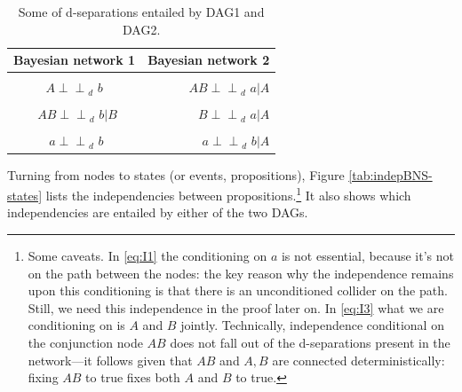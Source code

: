 \documentclass[
  10pt,
  dvipsnames,enabledeprecatedfontcommands]{scrartcl}
\newcommand{\indep}{\!\perp \!\!\! \perp\!}
\begin{document}
\begin{table}[h]
\begin{tabular}{cr}
\toprule
Bayesian network 1  & Bayesian network 2\\
\midrule
\cellcolor{gray!6}{$A   \indep_d\,\, B  $}&\cellcolor{gray!6}{     $ A  \indep_d\,\, b \vert  B  $} \\
$A   \indep_d\,\, b  $& $AB  \indep_d\,\,  a \vert  A$\\
\cellcolor{gray!6}{$\,\,\, AB  \indep_d\,\, a \vert A $}  & \cellcolor{gray!6}{$AB  \indep_d\,\,  b \vert  B $}\\
$\,\,\, AB  \indep_d\,\, b \vert B  $ & $ B  \indep_d\,\,  a \vert  A $\\
\cellcolor{gray!6}{$B   \indep_d\,\, a $}        & \cellcolor{gray!6}{$a  \indep_d\,\,  b \vert  B$ }\\
$\,\, a    \indep_d\,\, b$    & $a  \indep_d\,\,  b \vert  A $ \\
\bottomrule
\end{tabular}
\caption{Some of d-separations entailed by \textsf{DAG1} and \textsf{DAG2}.} 
\label{tab:indepBNS}
\end{table}

Turning from nodes to states (or events, propositions), Figure
\ref{tab:indepBNS-states} lists the independencies between
propositions.\footnote{Some caveats. In \eqref{eq:I1} the conditioning
  on \(a\) is not essential, because it's not on the path between the
  nodes: the key reason why the independence remains upon this
  conditioning is that there is an unconditioned collider on the path.
  Still, we need this independence in the proof later on. In
  \eqref{eq:I3} what we are conditioning on is \(A\) and \(B\) jointly.
  Technically, independence conditional on the conjunction node \(AB\)
  does not fall out of the d-separations present in the network---it
  follows given that \(AB\) and \(A,B\) are connected deterministically:
  fixing \(AB\) to true fixes both \(A\) and \(B\) to true.} It also
shows which independencies are entailed by either of the two DAGs.
\end{document}

